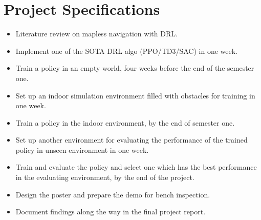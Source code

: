 \section{Project Specifications}

\begin{itemize}
\item Literature review on mapless navigation with DRL.
\item Implement one of the SOTA DRL algo (PPO/TD3/SAC) in one week.
\item Train a policy in an empty world, four weeks before the end of the semester one.
\item Set up an indoor simulation environment filled with obstacles for training in one week.
\item Train a policy in the indoor environment, by the end of semester one.
\item Set up another environment for evaluating the performance of the trained policy in unseen environment in one week.
\item Train and evaluate the policy and select one which has the best performance in the evaluating environment, by the end of the project.
\item Design the poster and prepare the demo for bench inspection.
\item Document findings along the way in the final project report.
\end{itemize}

